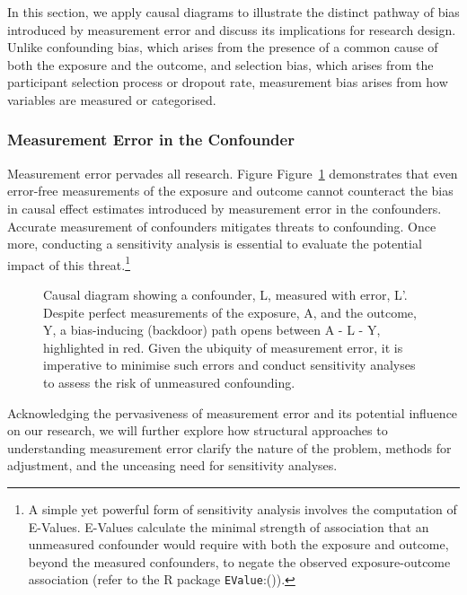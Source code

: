 \documentclass[
  singlecolumn]{article}
\begin{document}
In this section, we apply causal diagrams to illustrate the distinct
pathway of bias introduced by measurement error and discuss its
implications for research design. Unlike confounding bias, which arises
from the presence of a common cause of both the exposure and the
outcome, and selection bias, which arises from the participant selection
process or dropout rate, measurement bias arises from how variables are
measured or categorised.

\subsubsection{Measurement Error in the
Confounder}\label{measurement-error-in-the-confounder}

Measurement error pervades all research. Figure
Figure~\ref{fig-dag-measure-confounder} demonstrates that even
error-free measurements of the exposure and outcome cannot counteract
the bias in causal effect estimates introduced by measurement error in
the confounders. Accurate measurement of confounders mitigates threats
to confounding. Once more, conducting a sensitivity analysis is
essential to evaluate the potential impact of this threat.\footnote{A
  simple yet powerful form of sensitivity analysis involves the
  computation of E-Values. E-Values calculate the minimal strength of
  association that an unmeasured confounder would require with both the
  exposure and outcome, beyond the measured confounders, to negate the
  observed exposure-outcome association (refer to the R package
  \texttt{EValue}:()).}

\begin{figure}


\caption{\label{fig-dag-measure-confounder}Causal diagram showing a
confounder, L, measured with error, L'. Despite perfect measurements of
the exposure, A, and the outcome, Y, a bias-inducing (backdoor) path
opens between A - L - Y, highlighted in red. Given the ubiquity of
measurement error, it is imperative to minimise such errors and conduct
sensitivity analyses to assess the risk of unmeasured confounding.}

\end{figure}%

Acknowledging the pervasiveness of measurement error and its potential
influence on our research, we will further explore how structural
approaches to understanding measurement error clarify the nature of the
problem, methods for adjustment, and the unceasing need for sensitivity
analyses.
\end{document}
